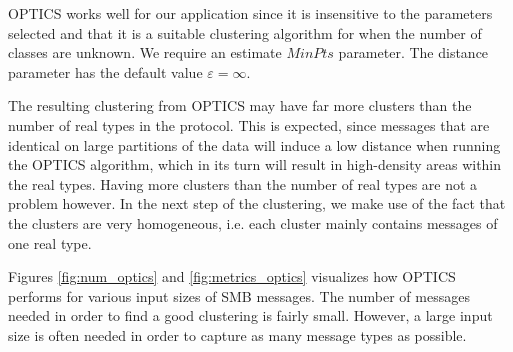 \documentclass[a4paper]{report}
\begin{document}
OPTICS works well for our application since it is insensitive to the parameters
selected and that it is a suitable clustering algorithm for when the number of
classes are unknown. We require an estimate $MinPts$ parameter. The distance
parameter has the default value $\varepsilon = \infty$.

The resulting clustering from OPTICS may have far more clusters than the number
of real types in the protocol. This is expected, since messages that are
identical on large partitions of the data will induce a low distance when
running the OPTICS algorithm, which in its turn will result in high-density
areas within the real types. Having more clusters than the number of real
types are not a problem however. In the next step of the clustering, we make
use of the fact that the clusters are very homogeneous, i.e. each cluster mainly
contains messages of one real type.

Figures \ref{fig:num_optics} and \ref{fig:metrics_optics} visualizes how OPTICS
performs for various input sizes of SMB messages. The number of messages needed
in order to find a good clustering is fairly small. However, a large input size
is often needed in order to capture as many message types as possible.
\end{document}
